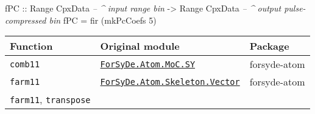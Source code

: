 \documentclass[
  a4paper,
]{article}
\newenvironment{Shaded}{}{}
\newcommand{\CommentTok}[1]{\textcolor[rgb]{0.38,0.63,0.69}{\textit{#1}}}
\newcommand{\DataTypeTok}[1]{\textcolor[rgb]{0.56,0.13,0.00}{#1}}
\newcommand{\DecValTok}[1]{\textcolor[rgb]{0.25,0.63,0.44}{#1}}
\newcommand{\FunctionTok}[1]{\textcolor[rgb]{0.02,0.16,0.49}{#1}}
\newcommand{\NormalTok}[1]{#1}
\newcommand{\OtherTok}[1]{\textcolor[rgb]{0.00,0.44,0.13}{#1}}
\begin{document}
\begin{Shaded}
\begin{Highlighting}[numbers=left,,firstnumber=220,]
\OtherTok{fPC ::} \DataTypeTok{Range} \DataTypeTok{CpxData} \CommentTok{-- ^ input range bin     }
    \OtherTok{->} \DataTypeTok{Range} \DataTypeTok{CpxData} \CommentTok{-- ^ output pulse-compressed bin}
\NormalTok{fPC }\FunctionTok{=}\NormalTok{ fir (mkPcCoefs }\DecValTok{5}\NormalTok{)}
\end{Highlighting}
\end{Shaded}

\begin{longtable}[]{@{}lll@{}}
\toprule
\begin{minipage}[b]{0.24\columnwidth}\raggedright
Function\strut
\end{minipage} & \begin{minipage}[b]{0.41\columnwidth}\raggedright
Original module\strut
\end{minipage} & \begin{minipage}[b]{0.26\columnwidth}\raggedright
Package\strut
\end{minipage}\tabularnewline
\midrule
\endhead
\begin{minipage}[t]{0.24\columnwidth}\raggedright
\texttt{comb11}\strut
\end{minipage} & \begin{minipage}[t]{0.41\columnwidth}\raggedright
\href{https://forsyde.github.io/forsyde-atom/api/ForSyDe-Atom-MoC-SY.html}{\texttt{ForSyDe.Atom.MoC.SY}}\strut
\end{minipage} & \begin{minipage}[t]{0.26\columnwidth}\raggedright
forsyde-atom\strut
\end{minipage}\tabularnewline
\begin{minipage}[t]{0.24\columnwidth}\raggedright
\texttt{farm11}\strut
\end{minipage} & \begin{minipage}[t]{0.41\columnwidth}\raggedright
\href{https://forsyde.github.io/forsyde-atom/api/ForSyDe-Atom-Skeleton-Vector.html}{\texttt{ForSyDe.Atom.Skeleton.Vector}}\strut
\end{minipage} & \begin{minipage}[t]{0.26\columnwidth}\raggedright
forsyde-atom\strut
\end{minipage}\tabularnewline
\begin{minipage}[t]{0.24\columnwidth}\raggedright
\texttt{farm11}, \texttt{transpose}\strut
\end{minipage} & \begin{minipage}[t]{0.41\columnwidth}\raggedright

\end{minipage}
\end{longtable}
\end{document}
